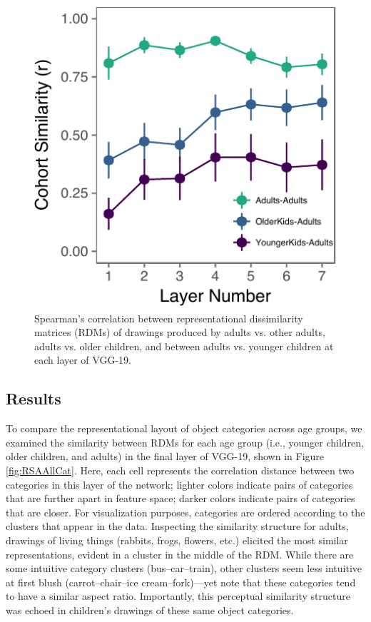 \documentclass[10pt, letterpaper]{article}
\newenvironment{CodeChunk}{}{}
\begin{document}
\begin{CodeChunk}
\begin{figure}[H]

{\centering \includegraphics{figs/layerWise-1} 

}

\caption[Spearman's correlation between representational dissimilarity matrices (RDMs) of drawings produced by adults vs]{Spearman's correlation between representational dissimilarity matrices (RDMs) of drawings produced by adults vs. other adults, adults vs. older children, and between adults vs. younger children at each layer of VGG-19. }\label{fig:layerWise}
\end{figure}
\end{CodeChunk}

\subsection{Results}\label{results-1}

To compare the representational layout of object categories across age
groups, we examined the similarity between RDMs for each age group
(i.e., younger children, older children, and adults) in the final layer
of VGG-19, shown in Figure \ref{fig:RSAAllCat}. Here, each cell
represents the correlation distance between two categories in this layer
of the network; lighter colors indicate pairs of categories that are
further apart in feature space; darker colors indicate pairs of
categories that are closer. For visualization purposes, categories are
ordered according to the clusters that appear in the data. Inspecting
the similarity structure for adults, drawings of living things (rabbits,
frogs, flowers, etc.) elicited the most similar representations, evident
in a cluster in the middle of the RDM. While there are some intuitive
category clusters (bus--car--train), other clusters seem less intuitive
at first blush (carrot--chair--ice cream--fork)---yet note that these
categories tend to have a similar aspect ratio. Importantly, this
perceptual similarity structure was echoed in children's drawings of
these same object categories.
\end{document}
